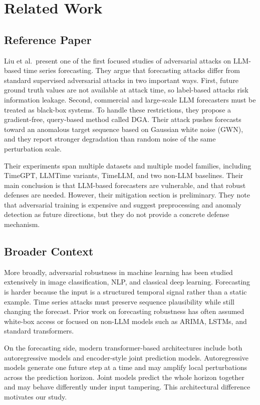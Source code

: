 \documentclass[11pt]{article}
\begin{document}
\section{Related Work}
\subsection{Reference Paper}
Liu et al.\ present one of the first focused studies of adversarial attacks on LLM-based time series forecasting. They argue that forecasting attacks differ from standard supervised adversarial attacks in two important ways. First, future ground truth values are not available at attack time, so label-based attacks risk information leakage. Second, commercial and large-scale LLM forecasters must be treated as black-box systems. To handle these restrictions, they propose a gradient-free, query-based method called DGA. Their attack pushes forecasts toward an anomalous target sequence based on Gaussian white noise (GWN), and they report stronger degradation than random noise of the same perturbation scale.

Their experiments span multiple datasets and multiple model families, including TimeGPT, LLMTime variants, TimeLLM, and two non-LLM baselines. Their main conclusion is that LLM-based forecasters are vulnerable, and that robust defenses are needed. However, their mitigation section is preliminary. They note that adversarial training is expensive and suggest preprocessing and anomaly detection as future directions, but they do not provide a concrete defense mechanism.

\subsection{Broader Context}
More broadly, adversarial robustness in machine learning has been studied extensively in image classification, NLP, and classical deep learning. Forecasting is harder because the input is a structured temporal signal rather than a static example. Time series attacks must preserve sequence plausibility while still changing the forecast. Prior work on forecasting robustness has often assumed white-box access or focused on non-LLM models such as ARIMA, LSTMs, and standard transformers.

On the forecasting side, modern transformer-based architectures include both autoregressive models and encoder-style joint prediction models. Autoregressive models generate one future step at a time and may amplify local perturbations across the prediction horizon. Joint models predict the whole horizon together and may behave differently under input tampering. This architectural difference motivates our study.
\end{document}
